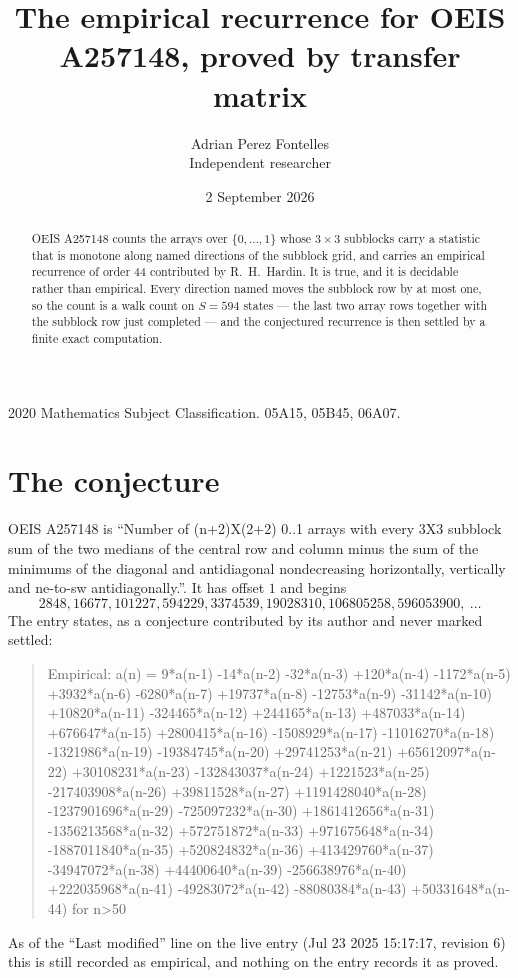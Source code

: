 \documentclass[11pt,a4paper]{article}
\title{The empirical recurrence for OEIS A257148, proved by transfer matrix}
\author{Adrian Perez Fontelles\\ \small Independent researcher}
\date{2 September 2026}
\theoremstyle{plain}
\theoremstyle{definition}
\begin{document}
\maketitle

\begin{abstract}
OEIS A257148 counts the arrays over $\{0,\dots,1\}$ whose $3\times3$ subblocks carry a
statistic that is monotone along named directions of the subblock grid, and carries an
empirical recurrence of order $44$ contributed by R.~H.~Hardin. It is true, and it is
decidable rather than empirical. Every direction named moves the subblock row by at most one,
so the count is a walk count on $S=594$ states --- the last two array rows together with the
subblock row just completed --- and the conjectured recurrence is then settled by a finite
exact computation.
\end{abstract}

\noindent\small 2020 Mathematics Subject Classification. 05A15, 05B45, 06A07.\normalsize

\section{The conjecture}

OEIS A257148 is ``Number of (n+2)X(2+2) 0..1 arrays with every 3X3 subblock sum of the two medians of the central row and column minus the sum of the minimums of the diagonal and antidiagonal nondecreasing horizontally, vertically and ne-to-sw antidiagonally.''. It has offset $1$ and begins
\[
2848, 16677, 101227, 594229, 3374539, 19028310, 106805258, 596053900,\ \dots
\]
The entry states, as a conjecture contributed by its author and never marked settled:
\begin{quote}
Empirical: a(n) = 9*a(n-1) -14*a(n-2) -32*a(n-3) +120*a(n-4) -1172*a(n-5) +3932*a(n-6) -6280*a(n-7) +19737*a(n-8) -12753*a(n-9) -31142*a(n-10) +10820*a(n-11) -324465*a(n-12) +244165*a(n-13) +487033*a(n-14) +676647*a(n-15) +2800415*a(n-16) -1508929*a(n-17) -11016270*a(n-18) -1321986*a(n-19) -19384745*a(n-20) +29741253*a(n-21) +65612097*a(n-22) +30108231*a(n-23) -132843037*a(n-24) +1221523*a(n-25) -217403908*a(n-26) +39811528*a(n-27) +1191428040*a(n-28) -1237901696*a(n-29) -725097232*a(n-30) +1861412656*a(n-31) -1356213568*a(n-32) +572751872*a(n-33) +971675648*a(n-34) -1887011840*a(n-35) +520824832*a(n-36) +413429760*a(n-37) -34947072*a(n-38) +44400640*a(n-39) -256638976*a(n-40) +222035968*a(n-41) -49283072*a(n-42) -88080384*a(n-43) +50331648*a(n-44) for n>50
\end{quote}
As of the ``Last modified'' line on the live entry (Jul 23 2025 15:17:17, revision 6) this is still
recorded as empirical, and nothing on the entry records it as proved.
\end{document}
